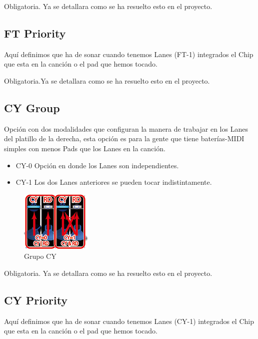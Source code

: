 \documentclass[a4paper,11pt,oneside]{book}
\begin{document}
Obligatoria. Ya se detallara como se ha resuelto esto en el proyecto.


\subsection{FT Priority}
Aquí definimos que ha de sonar cuando tenemos \gls{Lanes} (FT-1) integrados el Chip que esta en la canción o el pad que hemos tocado.

Obligatoria.Ya se detallara como se ha resuelto esto en el proyecto.


\subsection{CY Group}
Opción con dos modalidades que configuran la manera de trabajar en los \gls{Lanes} del platillo de la derecha, esta opción es para la gente que tiene baterías-MIDI simples con menos \gls{Pads} que los \gls{Lanes} en la canción.
\begin{itemize}
  \item CY-0 Opción en donde los \gls{Lanes} son independientes.
  \item CY-1 Los dos \gls{Lanes} anteriores se pueden tocar indistintamente.
\end{itemize}

\begin{figure}[H]
\begin{center}
\includegraphics[scale=1.0]{Imagenes/CY_group.png}
\caption{Grupo CY}
\label{Grupo CY}
\end{center}
\end{figure}

Obligatoria. Ya se detallara como se ha resuelto esto en el proyecto.

\subsection{CY Priority}
Aquí definimos que ha de sonar cuando tenemos \gls{Lanes} (CY-1) integrados el Chip que esta en la canción o el pad que hemos tocado.
\end{document}
